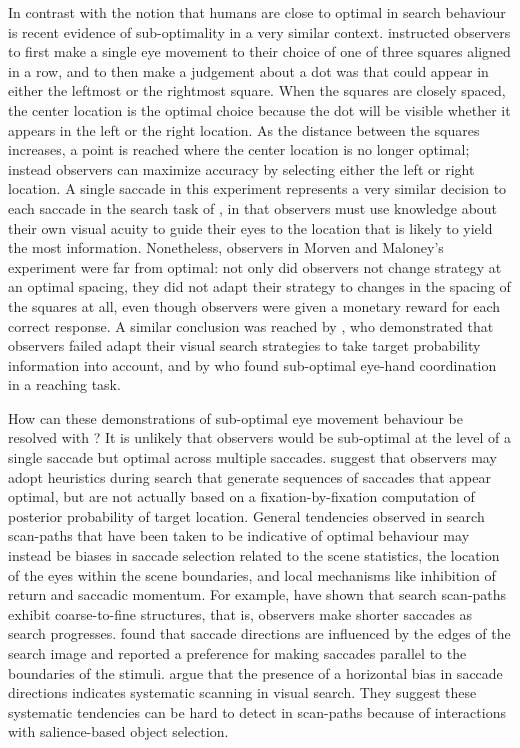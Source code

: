 \documentclass[preprint, authoryear]{elsarticle} %
\begin{document}
In contrast with the notion that humans are close to optimal in search behaviour is recent evidence of sub-optimality in a very similar context. \cite{morvan2012} instructed observers to first make a single eye movement to their choice of one of three squares aligned in a row, and to then make a judgement about a dot was that could appear in either the leftmost or the rightmost square. When the squares are closely spaced, the center location is the optimal choice because the dot will be visible whether it appears in the left or the right location. As the distance between the squares increases, a point is reached where the center location is no longer optimal; instead observers can maximize accuracy by selecting either the left or right location. A single saccade in this experiment represents a very similar decision to each saccade in the search task of  \cite{najemnik-geisler2005}, in that observers must use knowledge about their own visual acuity to guide their eyes to the location that is likely to yield the most information. Nonetheless, observers in Morven and Maloney's experiment were far from optimal: not only did observers not change strategy at an optimal spacing, they did not adapt their strategy to changes in the spacing of the squares at all, even though observers were given a monetary reward for each correct response. A similar conclusion was reached by \cite{verghese2012}, who demonstrated that observers failed adapt their visual search strategies to take target probability information into account, and by \cite{zhang2012} who found sub-optimal eye-hand coordination in a reaching task.
\par
How can these demonstrations of sub-optimal eye movement behaviour be resolved with \cite{najemnik-geisler2005,najemnik-geisler2008}? It is unlikely that observers would be sub-optimal at the level of a single saccade but optimal across multiple saccades. \cite{morvan2012} suggest that observers may adopt heuristics during search that generate sequences of saccades that appear optimal, but are not actually based on a fixation-by-fixation computation of posterior probability of target location. General tendencies observed in search scan-paths that have been taken to be indicative of optimal behaviour may instead be biases in saccade selection related to the scene statistics, the location of the eyes within the scene boundaries, and local mechanisms like inhibition of return and saccadic momentum. For example, \cite{over2007} have shown that search scan-paths exhibit coarse-to-fine structures, that is, observers make shorter saccades as search progresses. \cite{over2003} found that saccade directions are influenced by the edges of the search image and reported a preference for making saccades parallel to the boundaries of the stimuli.  \cite{gilchrist-harvey2006} argue that the presence of a horizontal bias in saccade directions indicates systematic scanning in visual search. They suggest these systematic tendencies can be hard to detect in scan-paths because of interactions with salience-based object selection. 
\end{document}
